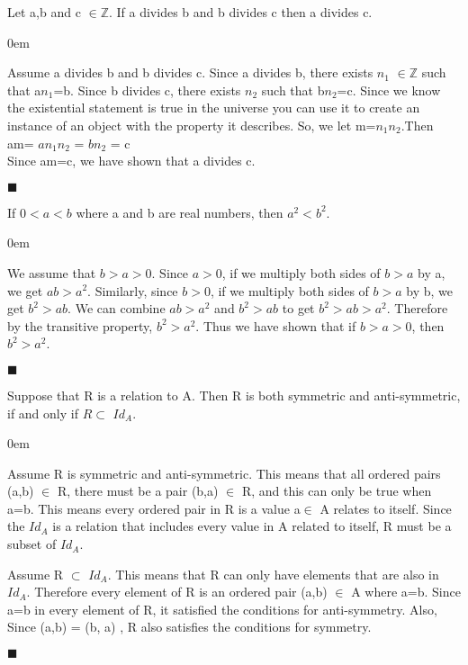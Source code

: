 \documentclass[12pt]{article}
\renewcommand{\qed}{\hfill$\blacksquare$}
\renewenvironment{proof}{\begin{addmargin}[1em]{0em}\begin{newproof}}{\end{newproof}\end{addmargin}\qed}
\newenvironment{theorem}[2][Theorem]{\begin{trivlist}
\item[\hskip \labelsep {\bfseries #1}\hskip \labelsep {\bfseries #2.}]}{\end{trivlist}}
\begin{document}
\begin{theorem}{4.4}
Let a,b and c $\in \mathbb{Z}$. If a divides b and b divides c then a divides c.

\end{theorem}
 
\begin{proof}[Proof]%
Assume a divides b and b divides c. Since a divides b, there exists $n_1$ $\in \mathbb{Z}$ such that a$n_1$=b. Since b divides c, there exists $n_2$ such that b$n_2$=c. Since we know the existential statement is true in the universe you can use it to create an instance of an object with the property it describes. So, we let m=$n_1n_2$.Then \\

					am= {$an_1n_2$} = {$bn_2$} = c \\

Since am=c, we have shown that a divides c.

\end{proof}

\begin{theorem}{6.1}
If $0< a < b$ where a and b are real numbers, then $a^{2} < b^{2}$.


\end{theorem}

\begin{proof}
We assume that $b > a > 0$. Since $a > 0$, if we multiply both sides of $b > a$ by a, we get $ab > a^{2}$. Similarly, since $b > 0$, if we multiply both sides of $b > a$ by b, we get $b^{2} > ab$. We can combine $ab > a^{2}$ and $b^{2} > ab$ to get $b^{2} > ab > a^{2}$. Therefore by the transitive property, $b^{2} > a^{2}$. Thus we have shown that if $b > a > 0$, then $b^{2} > a^{2}$.

\end{proof}


\begin{theorem}{7.11}
Suppose that R is a relation to A. Then R is both symmetric and anti-symmetric, if and only if $R \subset $ $Id_A$.

\end{theorem}


\begin{proof}[Proof]
	
    
    Assume R is symmetric and anti-symmetric. This means that all ordered pairs (a,b) $\in$ R, there must be a pair (b,a) $\in$ R, and this can only be true when a=b. This means every ordered pair in R is a value a$\in$ A relates to itself. Since the $Id_A$ is a relation that includes every value in A related to itself, R must be a subset of $Id_A$. 
	
    
    Assume R $\subset$ $Id_A$. This means that R can only have elements that are also in $Id_A$. Therefore every element of R is an ordered pair (a,b) $\in$ A where a=b. Since a=b in every element of R, it satisfied the conditions for anti-symmetry. Also, Since (a,b) = (b, a) , R also satisfies the conditions for symmetry. 
  

\end{proof}
\end{document}
